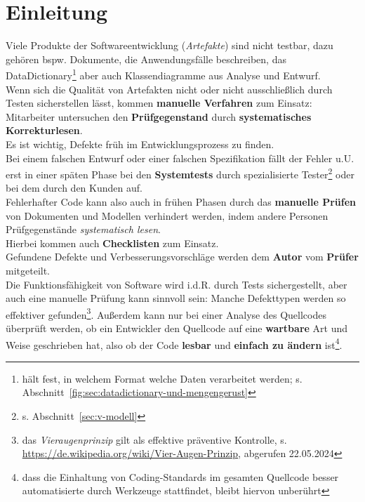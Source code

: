 \section{Einleitung}

Viele Produkte der Softwareentwicklung (\textit{Artefakte}) sind nicht testbar, dazu gehören bspw. Dokumente, die Anwendungsfälle beschreiben, das DataDictionary\footnote{
hält fest, in welchem Format welche Daten verarbeitet werden; s. Abschnitt~\ref{fig:sec:datadictionary-und-mengengerust}
} aber auch Klassendiagramme aus Analyse und Entwurf.\\
Wenn sich die Qualität von Artefakten nicht oder nicht ausschließlich durch Testen sicherstellen lässt, kommen \textbf{manuelle Verfahren} zum Einsatz: Mitarbeiter untersuchen den \textbf{Prüfgegenstand} durch \textbf{systematisches Korrekturlesen}.\\

\noindent
Es ist wichtig, Defekte früh im Entwicklungsprozess zu finden.\\
Bei einem falschen Entwurf oder einer falschen Spezifikation fällt der Fehler u.U. erst in einer späten Phase bei den \textbf{Systemtests} durch spezialisierte Tester\footnote{
s. Abschnitt~\ref{sec:v-modell}
} oder bei dem  durch den Kunden auf.\\
Fehlerhafter Code kann also auch in frühen Phasen durch das \textbf{manuelle Prüfen} von Dokumenten und Modellen verhindert werden, indem andere Personen Prüfgegenstände \textit{systematisch lesen}.\\
Hierbei kommen auch \textbf{Checklisten} zum Einsatz.\\
Gefundene Defekte und Verbesserungsvorschläge werden dem \textbf{Autor} vom \textbf{Prüfer} mitgeteilt.\\

\noindent
Die Funktionsfähigkeit von Software wird i.d.R. durch Tests sichergestellt, aber auch eine manuelle Prüfung kann sinnvoll sein: Manche Defekttypen werden so effektiver gefunden\footnote{
das \textit{Vieraugenprinzip} gilt als effektive präventive Kontrolle, s. \url{https://de.wikipedia.org/wiki/Vier-Augen-Prinzip}, abgerufen 22.05.2024
}.
Außerdem kann nur bei einer Analyse des Quellcodes überprüft werden, ob ein Entwickler den Quellcode auf eine \textbf{wartbare} Art und Weise geschrieben hat, also ob der Code \textbf{lesbar} und \textbf{einfach zu ändern} ist\footnote{
dass die Einhaltung von Coding-Standards im gesamten Quellcode besser automatisierte durch Werkzeuge stattfindet, bleibt hiervon unberührt
}.\\

